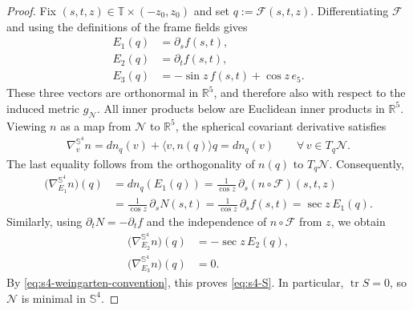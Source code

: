 \documentclass[a4paper,11pt,oneside,reqno]{amsart}
\numberwithin{equation}{section}
\theoremstyle{definition}
\begin{document}
\begin{proof}
    Fix $(s,t,z)\in\mathbb{T}\times(-z_0,z_0)$ and set $q:=\mathcal{F}(s,t,z)$.
    Differentiating $\mathcal{F}$ and using the
    definitions of the frame fields gives
    \begin{align*}
        E_1(q)&=\partial_sf(s,t),\\
        E_2(q)&=\partial_tf(s,t),\\
        E_3(q)&=-\sin z\,f(s,t)+\cos z\,e_5.
    \end{align*}
    These three vectors are orthonormal in
    $\mathbb{R}^5$, and therefore also with respect to
    the induced metric $g_{\mathcal{N}}$.
    All inner products below are Euclidean inner products
    in $\mathbb{R}^5$.
    Viewing $n$ as a map from $\mathcal{N}$ to
    $\mathbb{R}^5$, the spherical covariant derivative
    satisfies
    \begin{align*}
        \nabla^{\mathbb{S}^4}_v n
        =dn_q(v)+\langle v,n(q)\rangle q
        =dn_q(v)
        \qquad\forall\,v\in T_q\mathcal{N}.
    \end{align*}
    The last equality follows from the orthogonality
    of $n(q)$ to $T_q\mathcal{N}$.
    Consequently,
    \begin{align*}
        \bigl(\nabla^{\mathbb{S}^4}_{E_1}n\bigr)(q)
        &=dn_q(E_1(q))
        =\frac{1}{\cos z}\,
        \partial_s(n\circ\mathcal{F})(s,t,z)\\
        &=\frac{1}{\cos z}\,\partial_sN(s,t)
        =\frac{1}{\cos z}\,\partial_sf(s,t)
        =\sec z\,E_1(q).
    \end{align*}
    Similarly, using $\partial_tN=-\partial_tf$
    and the independence of $n\circ\mathcal{F}$ from $z$,
    we obtain
    \begin{align*}
        \bigl(\nabla^{\mathbb{S}^4}_{E_2}n\bigr)(q)
        &=-\sec z\,E_2(q),\\
        \bigl(\nabla^{\mathbb{S}^4}_{E_3}n\bigr)(q)
        &=0.
    \end{align*}
    By \eqref{eq:s4-weingarten-convention}, this proves \eqref{eq:s4-S}.
    In particular, $\operatorname{tr}S=0$, so
    $\mathcal{N}$ is minimal in $\mathbb{S}^4$.


\end{proof}
\end{document}
